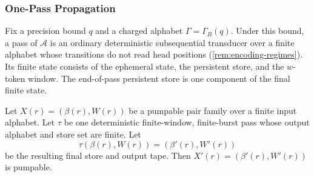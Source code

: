 \subsubsection{One-Pass Propagation}

Fix a precision bound $q$ and a charged alphabet $\Gamma=\Gamma_B(q)$. Under
this bound, a pass of $\mathcal{A}$ is an ordinary deterministic
subsequential transducer over a finite alphabet whose transitions do not
read head positions (\cref{rem:encoding-regimes}). Its finite state consists
of the ephemeral state, the persistent store, and the $w$-token window. The
end-of-pass persistent store is one component of the final finite state.

\begin{lemma}
\label{app:lem:one-pass-pump}
Let $X(r)=(\beta(r),W(r))$ be a pumpable pair family over a finite input
alphabet. Let $\tau$ be one deterministic finite-window, finite-burst pass whose
output alphabet and store set are finite. Let
\[
  \tau(\beta(r),W(r))=(\beta'(r),W'(r))
\]
be the resulting final store and output tape. Then
$X'(r)=(\beta'(r),W'(r))$ is pumpable.
\end{lemma}

